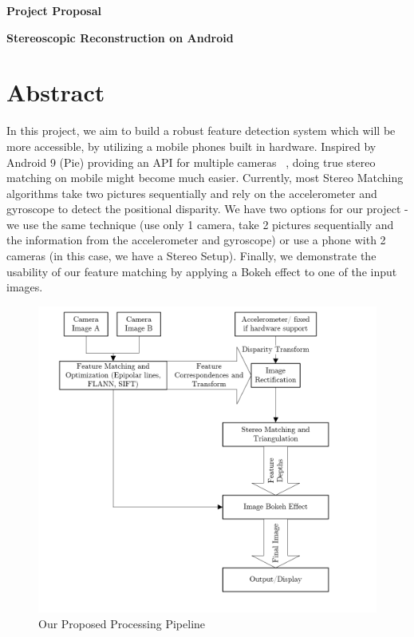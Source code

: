 \documentclass[a4paper,pagesize 10pt]{scrartcl}
\begin{document}
\begin{center}{\Huge\textbf{Project Proposal}}\end{center}

\begin{center}{\Large\textbf{Stereoscopic Reconstruction on Android}}\end{center}


\section{Abstract}

%
%
%
%
%
In this project, we aim to build a robust feature detection system which will be more accessible, by utilizing a mobile phones built in hardware.
Inspired by Android 9 (Pie)
providing an API for multiple cameras ~\cite{AndroidPMultiCamera}, doing true stereo matching on mobile might become much easier.
Currently, most Stereo Matching algorithms take two pictures sequentially and rely on the accelerometer and gyroscope to detect the positional disparity.
We have two options for our project - we use the same technique (use only 1 camera, take 2 pictures sequentially and the information from the accelerometer and gyroscope) or use a phone with 2 cameras (in this case, we have a Stereo Setup).
Finally, we demonstrate the usability of our feature matching by applying a Bokeh effect to one of the input images.
\begin{figure}[h]
	\centering
	\includegraphics[scale=0.55]{Pipeline.PNG}
	\caption{Our Proposed Processing Pipeline}
\end{figure}
\end{document}
